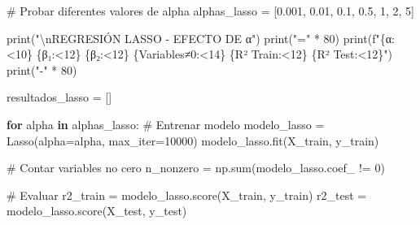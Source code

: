 \documentclass[
  doc,
  floatsintext,
  longtable,
  a4paper,
  nolmodern,
  notxfonts,
  notimes,
  12pt,
  colorlinks=true,linkcolor=blue,citecolor=blue,urlcolor=blue]{apa7}
\newenvironment{Shaded}{\begin{snugshade}}{\end{snugshade}}
\newcommand{\BuiltInTok}[1]{\textcolor[rgb]{0.00,0.23,0.31}{#1}}
\newcommand{\CharTok}[1]{\textcolor[rgb]{0.13,0.47,0.30}{#1}}
\newcommand{\CommentTok}[1]{\textcolor[rgb]{0.37,0.37,0.37}{#1}}
\newcommand{\ControlFlowTok}[1]{\textcolor[rgb]{0.00,0.23,0.31}{\textbf{#1}}}
\newcommand{\DecValTok}[1]{\textcolor[rgb]{0.68,0.00,0.00}{#1}}
\newcommand{\FloatTok}[1]{\textcolor[rgb]{0.68,0.00,0.00}{#1}}
\newcommand{\KeywordTok}[1]{\textcolor[rgb]{0.00,0.23,0.31}{\textbf{#1}}}
\newcommand{\NormalTok}[1]{\textcolor[rgb]{0.00,0.23,0.31}{#1}}
\newcommand{\OperatorTok}[1]{\textcolor[rgb]{0.37,0.37,0.37}{#1}}
\newcommand{\SpecialCharTok}[1]{\textcolor[rgb]{0.37,0.37,0.37}{#1}}
\newcommand{\SpecialStringTok}[1]{\textcolor[rgb]{0.13,0.47,0.30}{#1}}
\newcommand{\StringTok}[1]{\textcolor[rgb]{0.13,0.47,0.30}{#1}}
\begin{document}
\begin{Shaded}
\begin{Highlighting}[]
\CommentTok{\# Probar diferentes valores de alpha}
\NormalTok{alphas\_lasso }\OperatorTok{=}\NormalTok{ [}\FloatTok{0.001}\NormalTok{, }\FloatTok{0.01}\NormalTok{, }\FloatTok{0.1}\NormalTok{, }\FloatTok{0.5}\NormalTok{, }\DecValTok{1}\NormalTok{, }\DecValTok{2}\NormalTok{, }\DecValTok{5}\NormalTok{]}

\BuiltInTok{print}\NormalTok{(}\StringTok{"}\CharTok{\textbackslash{}n}\StringTok{REGRESIÓN LASSO {-} EFECTO DE α"}\NormalTok{)}
\BuiltInTok{print}\NormalTok{(}\StringTok{"="} \OperatorTok{*} \DecValTok{80}\NormalTok{)}
\BuiltInTok{print}\NormalTok{(}\SpecialStringTok{f"}\SpecialCharTok{\{}\StringTok{\textquotesingle{}α\textquotesingle{}}\SpecialCharTok{:\textless{}10\}}\SpecialStringTok{ }\SpecialCharTok{\{}\StringTok{\textquotesingle{}β₁\textquotesingle{}}\SpecialCharTok{:\textless{}12\}}\SpecialStringTok{ }\SpecialCharTok{\{}\StringTok{\textquotesingle{}β₂\textquotesingle{}}\SpecialCharTok{:\textless{}12\}}\SpecialStringTok{ }\SpecialCharTok{\{}\StringTok{\textquotesingle{}Variables≠0\textquotesingle{}}\SpecialCharTok{:\textless{}14\}}\SpecialStringTok{ }\SpecialCharTok{\{}\StringTok{\textquotesingle{}R² Train\textquotesingle{}}\SpecialCharTok{:\textless{}12\}}\SpecialStringTok{ }\SpecialCharTok{\{}\StringTok{\textquotesingle{}R² Test\textquotesingle{}}\SpecialCharTok{:\textless{}12\}}\SpecialStringTok{"}\NormalTok{)}
\BuiltInTok{print}\NormalTok{(}\StringTok{"{-}"} \OperatorTok{*} \DecValTok{80}\NormalTok{)}

\NormalTok{resultados\_lasso }\OperatorTok{=}\NormalTok{ []}

\ControlFlowTok{for}\NormalTok{ alpha }\KeywordTok{in}\NormalTok{ alphas\_lasso:}
    \CommentTok{\# Entrenar modelo}
\NormalTok{    modelo\_lasso }\OperatorTok{=}\NormalTok{ Lasso(alpha}\OperatorTok{=}\NormalTok{alpha, max\_iter}\OperatorTok{=}\DecValTok{10000}\NormalTok{)}
\NormalTok{    modelo\_lasso.fit(X\_train, y\_train)}
    
    \CommentTok{\# Contar variables no cero}
\NormalTok{    n\_nonzero }\OperatorTok{=}\NormalTok{ np.}\BuiltInTok{sum}\NormalTok{(modelo\_lasso.coef\_ }\OperatorTok{!=} \DecValTok{0}\NormalTok{)}
    
    \CommentTok{\# Evaluar}
\NormalTok{    r2\_train }\OperatorTok{=}\NormalTok{ modelo\_lasso.score(X\_train, y\_train)}
\NormalTok{    r2\_test }\OperatorTok{=}\NormalTok{ modelo\_lasso.score(X\_test, y\_test)}
    

\end{Highlighting}
\end{Shaded}
\end{document}
